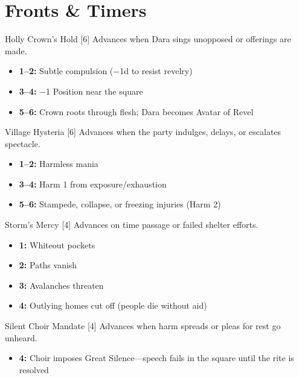 \documentclass[11pt]{article}
\begin{document}
\section*{Fronts \& Timers}

\begin{mechanicsbox}{Holly Crown's Hold [6]}
Advances when Dara sings unopposed or offerings are made.
\begin{itemize}
    \item \textbf{1--2:} Subtle compulsion (−1d to resist revelry)
    \item \textbf{3--4:} −1 Position near the square
    \item \textbf{5--6:} Crown roots through flesh; Dara becomes Avatar of Revel
\end{itemize}
\end{mechanicsbox}

\begin{mechanicsbox}{Village Hysteria [6]}
Advances when the party indulges, delays, or escalates spectacle.
\begin{itemize}
    \item \textbf{1--2:} Harmless mania
    \item \textbf{3--4:} Harm 1 from exposure/exhaustion
    \item \textbf{5--6:} Stampede, collapse, or freezing injuries (Harm 2)
\end{itemize}
\end{mechanicsbox}

\begin{mechanicsbox}{Storm's Mercy [4]}
Advances on time passage or failed shelter efforts.
\begin{itemize}
    \item \textbf{1:} Whiteout pockets
    \item \textbf{2:} Paths vanish
    \item \textbf{3:} Avalanches threaten
    \item \textbf{4:} Outlying homes cut off (people die without aid)
\end{itemize}
\end{mechanicsbox}

\begin{mechanicsbox}{Silent Choir Mandate [4]}
Advances when harm spreads or pleas for rest go unheard.
\begin{itemize}
    \item \textbf{4:} Choir imposes Great Silence---speech fails in the square until the rite is resolved
\end{itemize}
\end{mechanicsbox}
\end{document}
